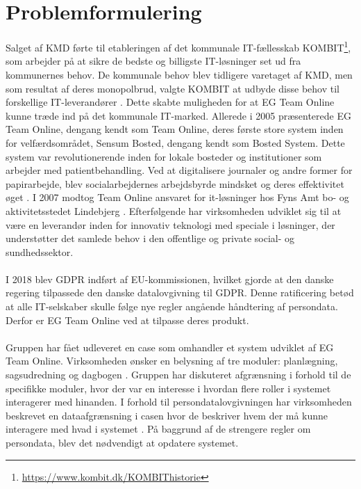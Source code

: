 \section{Problemformulering}
Salget af KMD førte til etableringen af det kommunale IT-fællesskab KOMBIT\footnote{\url{ https://www.kombit.dk/KOMBIThistorie}}, som arbejder på at sikre de bedste og billigste IT-løsninger set ud fra kommunernes behov. De kommunale behov blev tidligere varetaget af KMD, men som resultat af deres monopolbrud, valgte KOMBIT at udbyde disse behov til forskellige IT-leverandører . Dette skabte muligheden for at EG Team Online kunne træde ind på det kommunale IT-marked.
Allerede i 2005 præsenterede EG Team Online, dengang kendt som Team Online, deres første store system inden for velfærdsområdet, Sensum Bosted, dengang kendt som Bosted System. Dette system var revolutionerende inden for lokale bosteder og institutioner som arbejder med patientbehandling. Ved at digitalisere journaler og andre former for papirarbejde, blev socialarbejdernes arbejdsbyrde mindsket og deres effektivitet øget . I 2007 modtog Team Online ansvaret for it-løsninger hos Fyns Amt bo- og aktivitetsstedet Lindebjerg . Efterfølgende har virksomheden udviklet sig til at være en leverandør inden for innovativ teknologi med speciale i løsninger, der understøtter det samlede behov i den offentlige og private social- og sundhedssektor.\\ \\
I 2018 blev GDPR indført af EU-kommissionen, hvilket gjorde at den danske regering tilpassede den danske datalovgivning til GDPR. Denne ratificering betød at alle IT-selskaber skulle følge nye regler angående håndtering af persondata. Derfor er EG Team Online ved at tilpasse deres produkt.\\ \\
Gruppen har fået udleveret en case som omhandler et system udviklet af EG Team Online. Virksomheden ønsker en belysning af tre moduler: planlægning, sagsudredning og dagbogen . Gruppen har diskuteret afgrænsning i forhold til de specifikke moduler, hvor der var en interesse i hvordan flere roller i systemet interagerer med hinanden. I forhold til persondatalovgivningen har virksomheden beskrevet  en dataafgrænsning i casen hvor de beskriver hvem der må kunne interagere med hvad i systemet . På baggrund af de strengere regler om persondata, blev det nødvendigt at opdatere systemet.\\

